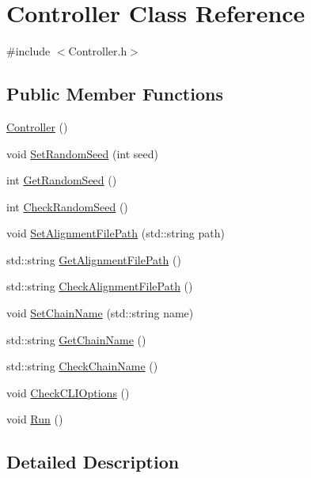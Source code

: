 \hypertarget{classController}{}\section{Controller Class Reference}
\label{classController}


{\ttfamily \#include $<$Controller.\+h$>$}

\subsection*{Public Member Functions}
\begin{DoxyCompactItemize}
\item 
\hyperlink{classController_a95c56822d667e94b031451729ce069a9}{Controller} ()
\item 
void \hyperlink{classController_a1438b54d76df7239f361bd93dfbf9246}{Set\+Random\+Seed} (int seed)
\item 
int \hyperlink{classController_acee3589ec24f9a9432c07f2fe77f005b}{Get\+Random\+Seed} ()
\item 
int \hyperlink{classController_a0a7005db27b63a01f4917134da0ae600}{Check\+Random\+Seed} ()
\item 
void \hyperlink{classController_a67b2357dbc00faba0f6557f3660e8711}{Set\+Alignment\+File\+Path} (std\+::string path)
\item 
std\+::string \hyperlink{classController_a5a9cf95b7410c4ca65036b8204856cd0}{Get\+Alignment\+File\+Path} ()
\item 
std\+::string \hyperlink{classController_a79fd3abba4177d597d571a97032c6432}{Check\+Alignment\+File\+Path} ()
\item 
void \hyperlink{classController_aa122ac902c36eeb2889e12558d4ad087}{Set\+Chain\+Name} (std\+::string name)
\item 
std\+::string \hyperlink{classController_a62139e7d2c85afb9046dd47528882089}{Get\+Chain\+Name} ()
\item 
std\+::string \hyperlink{classController_a207236dbade67acf265531bfa7769056}{Check\+Chain\+Name} ()
\item 
void \hyperlink{classController_a1307438a1590b0deff238e4ee46aaed3}{Check\+C\+L\+I\+Options} ()
\item 
void \hyperlink{classController_a17abb2cec6c0109e9b2df3cdc082eaad}{Run} ()
\end{DoxyCompactItemize}


\subsection{Detailed Description}


